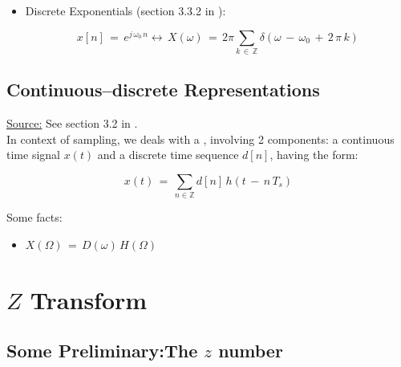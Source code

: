 \documentclass[12pt,a4paper]{book}
\begin{document}
\begin{itemize}
\item Discrete Exponentials (section 3.3.2 in \cite{sampling_beyond_band_limited_systems}):

\begin{equation}
    x[n] \, = \, e^{j \, \omega_0 \, n} \leftrightarrow \, X(\omega) \, = \, 2 \pi \displaystyle\sum_{k \, \in \, \mathbb{Z}} \delta(\omega \, - \, \omega_0 \, + \, 2 \,  \pi \, k)
\end{equation}
    
\end{itemize}

\section{Continuous–discrete Representations}

\underline{Source:} See section 3.2 in \cite{sampling_beyond_band_limited_systems}.\\

In context of sampling, we deals with a , involving 2 components: a continuous time signal $x(t)$ and a discrete time sequence $d[n]$, having the form:


\begin{equation}
    x(t) \, = \, \displaystyle\sum_{n \in \mathbb{Z}} d[n] \, h(t \, - \, n \, T_s)
\end{equation}

Some facts:

\begin{itemize}
    \item $X(\Omega) \, = \, D(\omega) \, H(\Omega)$
\end{itemize}






\chapter{$Z$ Transform}


\section{Some Preliminary:The $z$ number}
\end{document}
